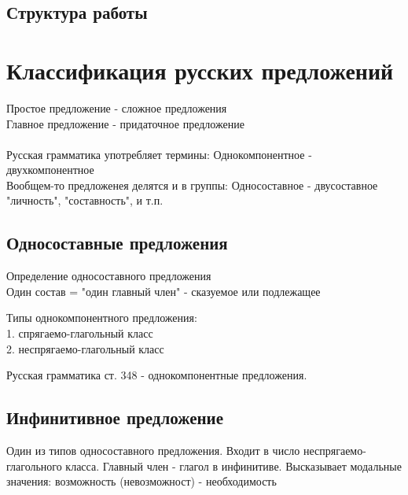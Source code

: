 \documentclass{article}
\begin{document}

\subsection{Структура работы}


\section{Классификация русских предложений}

Простое предложение - сложное предложения \\
Главное предложение - придаточное предложение \\
\\

Русская грамматика употребляет термины:
Однокомпонентное - двухкомпонентное \\

Вообщем-то предложенея делятся и в группы:
Односоставное - двусоставное \\

"личность", "составность", и т.п.

\subsection{Односоставные предложения}

Определение односоставного предложения  \\

Один состав = "один главный член" -  сказуемое или подлежащее



Типы однокомпонентного предложения: \\ 
	1. спрягаемо-глагольный класс \\
	2. неспрягаемо-глагольный класс

Русская грамматика ст. 348 - однокомпонентные предложения.

\subsection{Инфинитивное предложение}

Один из типов односоставного предложения. Входит в число неспрягаемо-глагольного класса. Главный член - глагол в инфинитиве. Высказывает модальные значения: возможность (невозможност) - необходимость 
\end{document}
